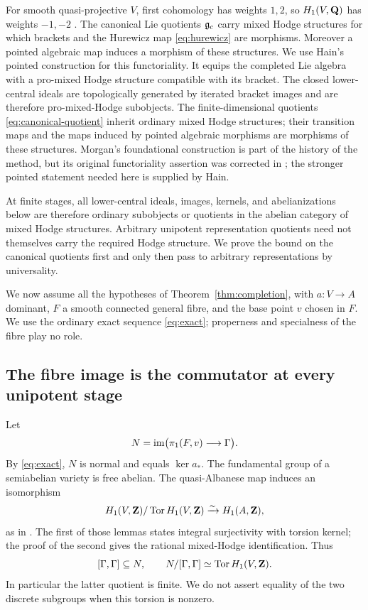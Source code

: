 For smooth quasi-projective $V$, first cohomology has weights $1,2$,
so $H_1(V,\mathbf Q)$ has weights $-1,-2$
\cite[Corollary 3.2.15(ii)]{Deligne1971}. The canonical Lie quotients
$\mathfrak g_c$ carry mixed Hodge structures for which brackets and the
Hurewicz map \eqref{eq:hurewicz} are morphisms. Moreover a pointed
algebraic map induces a morphism of these structures. We use Hain's
pointed construction \cite[Theorem 6.3.1, p.~321]{Hain1987} for this
functoriality. It equips the completed Lie algebra with a pro-mixed
Hodge structure compatible with its bracket. The closed lower-central
ideals are topologically generated by iterated bracket images and are
therefore pro-mixed-Hodge subobjects. The finite-dimensional quotients
\eqref{eq:canonical-quotient} inherit ordinary mixed Hodge structures;
their transition maps and the maps induced by pointed algebraic
morphisms are morphisms of these structures. Morgan's foundational construction
\cite{Morgan1978} is part of the history of the method, but its original
functoriality assertion was corrected in \cite{Morgan1986}; the stronger
pointed statement needed here is supplied by Hain.

At finite stages, all lower-central ideals, images, kernels, and
abelianizations below are therefore ordinary subobjects or quotients in
the abelian category of mixed Hodge structures. Arbitrary unipotent
representation quotients need not themselves carry the required Hodge
structure. We prove the bound on the canonical quotients first and only
then pass to arbitrary representations by universality.

We now assume all the hypotheses of Theorem~\ref{thm:completion}, with
$a:V\to A$ dominant, $F$ a smooth connected general fibre, and the
base point $v$ chosen in $F$. We use the ordinary exact sequence
\eqref{eq:exact}; properness and specialness of the fibre play no role.

\subsection{The fibre image is the commutator at every unipotent stage}
Let
\[
 N=\operatorname{im}\bigl(\pi_1(F,v)\longrightarrow\Gamma\bigr).
\]
By \eqref{eq:exact}, $N$ is normal and equals $\ker a_*$. The fundamental
group of a semiabelian variety is free abelian. The quasi-Albanese map
induces an isomorphism
\begin{equation}\label{eq:alb-integral-h1}
 H_1(V,\mathbf Z)/\operatorname{Tor} H_1(V,\mathbf Z)\xrightarrow{\sim}H_1(A,\mathbf Z),
\end{equation}
as in \cite[Lemmas 3.11--3.12, arXiv v2 PDF, pp.~20--21]{Fujino2024}.
The first of those lemmas states integral surjectivity with torsion
kernel; the proof of the second gives the rational mixed-Hodge identification. Thus
\begin{equation}\label{eq:almost-derived}
 [\Gamma,\Gamma]\subseteq N,
 \qquad
 N/[\Gamma,\Gamma]\simeq\operatorname{Tor} H_1(V,\mathbf Z).
\end{equation}
In particular the latter quotient is finite. We do not assert equality
of the two discrete subgroups when this torsion is nonzero.

